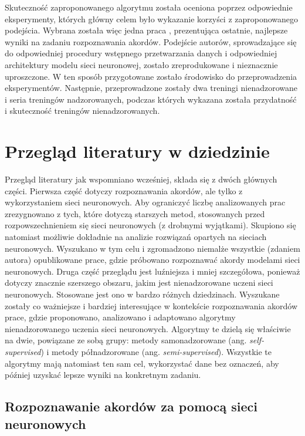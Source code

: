 Skuteczność zaproponowanego algorytmu została oceniona poprzez odpowiednie eksperymenty, których główny celem było wykazanie korzyści z zaproponowanego podejścia. Wybrana została więc jedna praca \cite{park_bi-directional_2019}, prezentująca ostatnie, najlepsze wyniki na zadaniu rozpoznawania akordów. Podejście autorów, sprowadzające się do odpowiedniej procedury wstępnego przetwarzania danych i odpowiedniej architektury modelu sieci neuronowej, zostało zreprodukowane i nieznacznie uproszczone. W ten sposób przygotowane zostało środowisko do przeprowadzenia eksperymentów. Następnie, przeprowadzone zostały dwa treningi nienadzorowane i seria treningów nadzorowanych, podczas których wykazana została przydatność i skuteczność treningów nienadzorowanych.



\section{Przegląd literatury w dziedzinie}

Przegląd literatury jak wspomniano wcześniej, składa się z dwóch głównych części. Pierwsza część dotyczy rozpoznawania akordów, ale tylko z wykorzystaniem sieci neuronowych. Aby ograniczyć liczbę analizowanych prac zrezygnowano z tych, które dotyczą starszych metod, stosowanych przed rozpowszechnieniem się sieci neuronowych (z drobnymi wyjątkami). Skupiono się natomiast możliwie dokładnie na analizie rozwiązań opartych na sieciach neuronowych. Wyszukano w tym celu i zgromadzono niemalże wszystkie (zdaniem autora) opublikowane prace, gdzie próbowano rozpoznawać akordy modelami sieci neuronowych. Druga część przeglądu jest luźniejsza i mniej szczegółowa, ponieważ dotyczy znacznie szerszego obszaru, jakim jest nienadzorowane uczeni sieci neuronowych. Stosowane jest ono w bardzo różnych dziedzinach. Wyszukane zostały co ważniejsze i bardziej interesujące w kontekście rozpoznawania akordów prace, gdzie proponowano, analizowano i adaptowano algorytmy nienadzorowanego uczenia sieci neuronowych. Algorytmy te dzielą się właściwie na dwie, powiązane ze sobą grupy: metody samonadzorowane (ang. \emph{self-supervised}) i metody półnadzorowane (ang. \emph{semi-supervised}). Wszystkie te algorytmy mają natomiast ten sam cel, wykorzystać dane bez oznaczeń, aby później uzyskać lepsze wyniki na konkretnym zadaniu.

\subsection{Rozpoznawanie akordów za pomocą sieci neuronowych}

